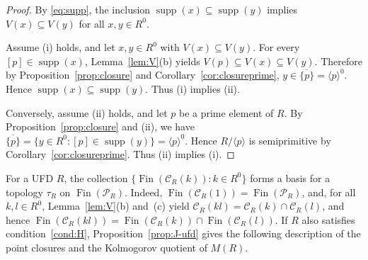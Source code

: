 \documentclass[12pt,reqno,a4paper]{amsart}
\newcommand{\Pe}{\mathcal{P}}
\newcommand{\clo}[1]{\overline{\{#1\}}}
\DeclareMathOperator{\Fin}{Fin}
\DeclareMathOperator{\supp}{supp}
\theoremstyle{plain}
\theoremstyle{definition}
\begin{document}
\begin{proof}
By \eqref{eq:supp}, the inclusion $\supp(x)\subseteq\supp(y)$ implies $V(x)\subseteq V(y)$ for all $x,y\in R^0$. 

Assume (i) holds, and let $x,y\in R^0$ with $V(x)\subseteq V(y)$. For every $[p]\in\supp(x)$, Lemma~\ref{lem:V}(b) yields $V(p)\subseteq V(x)\subseteq V(y)$. Therefore by Proposition~\ref{prop:closure} and Corollary~\ref{cor:closureprime}, $y\in\clo{p}=\langle p\rangle^0$. Hence $\supp(x)\subseteq\supp(y)$. Thus (i) implies (ii). 

Conversely, assume (ii) holds, and let $p$ be a prime element of $R$. By Proposition~\ref{prop:closure} and (ii), we have $\clo{p}=\{y\in R^0:[p]\in\supp(y)\}=\langle p\rangle^0$. Hence $R/\langle p\rangle$ is semiprimitive by Corollary~\ref{cor:closureprime}. Thus (ii) implies (i).
\end{proof}

For a UFD $R$, the collection $\{\Fin(\mathcal{C}_R(k)):k\in R^0\}$ forms a basis for a topology $\tau_R$ on $\Fin(\Pe_R)$. Indeed, $\Fin(\mathcal{C}_R(1))=\Fin(\Pe_R)$, and, for all $k,l\in R^0$, Lemma~\ref{lem:V}(b) and~(c) yield $\mathcal{C}_R(kl)=\mathcal{C}_R(k)\cap\mathcal{C}_R(l)$, and hence $\Fin(\mathcal{C}_R(kl))=\Fin(\mathcal{C}_R(k))\cap\Fin(\mathcal{C}_R(l))$. If $R$ also satisfies condition~\ref{cond:H}, Proposition~\ref{prop:J-ufd} gives the following description of the point closures and the Kolmogorov quotient of $M(R)$.
\end{document}
